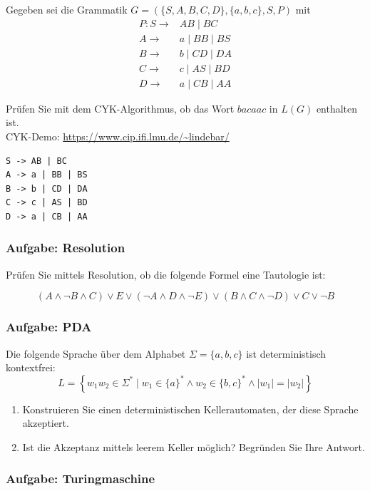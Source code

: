 \documentclass[a4paper,14pt,ngerman]{scrartcl}
\begin{document}
Gegeben sei die Grammatik \(G=(\{S, A, B, C, D\}, \{a, b, c\}, S, P)\)
mit \\
\[\begin{aligned}
        P:S\rightarrow & AB \mid BC\\
        A\rightarrow & a \mid BB \mid BS\\
        B\rightarrow & b \mid CD \mid DA\\
        C\rightarrow & c \mid AS \mid BD\\
        D\rightarrow & a \mid CB \mid AA    
\end{aligned}\]

Prüfen Sie mit dem CYK-Algorithmus, ob das Wort \(bacaac\) in \(L(G)\) enthalten ist.\\
CYK-Demo: \url{https://www.cip.ifi.lmu.de/\~lindebar/}

\begin{verbatim}
S -> AB | BC
A -> a | BB | BS
B -> b | CD | DA
C -> c | AS | BD
D -> a | CB | AA
\end{verbatim}
\subsubsection{\textbf{Aufgabe: Resolution}}
\label{sec:orgae02c67}

Prüfen Sie mittels Resolution, ob die folgende Formel eine Tautologie
ist:

\[(A\land \neg B \land C) \lor E \lor (\neg A \land D \land \neg E) \lor (B \land C \land \neg D) \lor C \lor \neg B\]
\subsubsection{\textbf{Aufgabe: PDA}}
\label{sec:org3fe1e9d}

Die folgende Sprache über dem Alphabet \(\Sigma=\{a, b, c\}\) ist
deterministisch kontextfrei:
\[L = \left\{w_1w_2 \in \Sigma^* \mid w_1 \in \{a\}^* \land w_2 \in \{b, c\}^* \land |w_1|=|w_2|\right\}\]

\begin{enumerate}
\item Konstruieren Sie einen deterministischen Kellerautomaten, der diese
Sprache akzeptiert.

\item Ist die Akzeptanz mittels leerem Keller möglich? Begründen Sie Ihre
Antwort.
\end{enumerate}
\subsubsection{\textbf{Aufgabe: Turingmaschine}}
\label{sec:org8594292}
\end{document}
